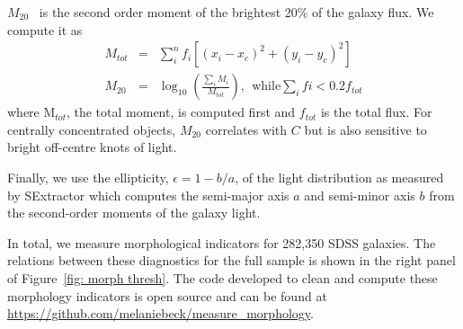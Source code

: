 \documentclass[twocolumn]{aastex6}%
\newcommand\aastex{AAS\TeX}
\newcommand{\M}[1]{$M_{\mathrm{#1}}$}
\begin{document}
\M{20}~\citep{Lotz2004} is the second order moment of the brightest 20\% of the galaxy flux. We compute it as
\begin{eqnarray}
 M_{tot} & = & \sum_i^nf_i[(x_i-x_c)^2 + (y_i-y_c)^2]  \\
 M_{20} & = & \log_{10} (\frac{\sum_iM_i}{M_{tot}}), ~~\textrm{while} \sum_ifi < 0.2f_{tot}
\end{eqnarray}
where M$_{tot}$, the total moment, is computed first and $f_{tot}$ is the total flux. For centrally concentrated objects, \M{20} correlates with $C$ but is also sensitive to bright off-centre knots of light. 

Finally, we use the ellipticity, $\epsilon = 1 - b/a$, of the light distribution as measured by SExtractor which computes the semi-major axis $a$ and semi-minor axis $b$ from the second-order moments of the galaxy light.  

In total, we measure morphological indicators for 282,350 SDSS galaxies. The relations between these diagnostics for the full sample is shown in the right panel of Figure~\ref{fig: morph thresh}. The code developed to clean and compute these morphology indicators is open source and can be found at \url{https://github.com/melaniebeck/measure_morphology}.







\end{document}
